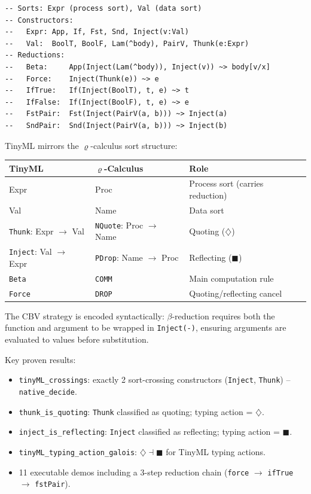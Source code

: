 \documentclass[]{article}
\newcommand{\code}[1]{\texttt{#1}}
\newcommand{\rhocalc}{\ensuremath{\varrho}}
\newcommand{\Dia}{\ensuremath{\diamondsuit}}
\newcommand{\Bx}{\ensuremath{\blacksquare}}
\begin{document}
\begin{lstlisting}[caption={TinyML language definition (TinyMLInstance.lean)}]
-- Sorts: Expr (process sort), Val (data sort)
-- Constructors:
--   Expr: App, If, Fst, Snd, Inject(v:Val)
--   Val:  BoolT, BoolF, Lam(^body), PairV, Thunk(e:Expr)
-- Reductions:
--   Beta:     App(Inject(Lam(^body)), Inject(v)) ~> body[v/x]
--   Force:    Inject(Thunk(e)) ~> e
--   IfTrue:   If(Inject(BoolT), t, e) ~> t
--   IfFalse:  If(Inject(BoolF), t, e) ~> e
--   FstPair:  Fst(Inject(PairV(a, b))) ~> Inject(a)
--   SndPair:  Snd(Inject(PairV(a, b))) ~> Inject(b)
\end{lstlisting}

TinyML mirrors the \rhocalc{}-calculus sort structure:
\begin{center}
\begin{tabular}{lll}
\textbf{TinyML} & \textbf{\rhocalc{}-Calculus} & \textbf{Role} \\
\hline
Expr & Proc & Process sort (carries reduction) \\
Val & Name & Data sort \\
\code{Thunk}: Expr $\to$ Val & \code{NQuote}: Proc $\to$ Name & Quoting ($\Dia$) \\
\code{Inject}: Val $\to$ Expr & \code{PDrop}: Name $\to$ Proc & Reflecting ($\Bx$) \\
\code{Beta} & \code{COMM} & Main computation rule \\
\code{Force} & \code{DROP} & Quoting/reflecting cancel \\
\end{tabular}
\end{center}

The CBV strategy is encoded syntactically: $\beta$-reduction requires both the
function and argument to be wrapped in \code{Inject(-)}, ensuring arguments
are evaluated to values before substitution.

Key proven results:
\begin{itemize}
\item \code{tinyML\_crossings}: exactly 2 sort-crossing constructors
  (\code{Inject}, \code{Thunk}) -- \code{native\_decide}.
\item \code{thunk\_is\_quoting}: \code{Thunk} classified as quoting; typing action = $\Dia$.
\item \code{inject\_is\_reflecting}: \code{Inject} classified as reflecting; typing action = $\Bx$.
\item \code{tinyML\_typing\_action\_galois}: $\Dia \dashv \Bx$ for TinyML typing actions.
\item 11 executable demos including a 3-step reduction chain
  (\code{force} $\to$ \code{ifTrue} $\to$ \code{fstPair}).
\end{itemize}
\end{document}
